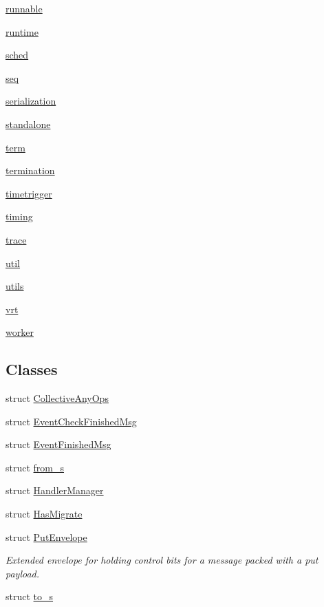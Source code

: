 \begin{DoxyCompactItemize}
 \hyperlink{namespacevt_1_1runnable}{runnable}
\item 
 \hyperlink{namespacevt_1_1runtime}{runtime}
\item 
 \hyperlink{namespacevt_1_1sched}{sched}
\item 
 \hyperlink{namespacevt_1_1seq}{seq}
\item 
 \hyperlink{namespacevt_1_1serialization}{serialization}
\item 
 \hyperlink{namespacevt_1_1standalone}{standalone}
\item 
 \hyperlink{namespacevt_1_1term}{term}
\item 
 \hyperlink{namespacevt_1_1termination}{termination}
\item 
 \hyperlink{namespacevt_1_1timetrigger}{timetrigger}
\item 
 \hyperlink{namespacevt_1_1timing}{timing}
\item 
 \hyperlink{namespacevt_1_1trace}{trace}
\item 
 \hyperlink{namespacevt_1_1util}{util}
\item 
 \hyperlink{namespacevt_1_1utils}{utils}
\item 
 \hyperlink{namespacevt_1_1vrt}{vrt}
\item 
 \hyperlink{namespacevt_1_1worker}{worker}
\end{DoxyCompactItemize}
\subsection*{Classes}
\begin{DoxyCompactItemize}
\item 
struct \hyperlink{structvt_1_1_collective_any_ops}{Collective\+Any\+Ops}
\item 
struct \hyperlink{structvt_1_1_event_check_finished_msg}{Event\+Check\+Finished\+Msg}
\item 
struct \hyperlink{structvt_1_1_event_finished_msg}{Event\+Finished\+Msg}
\item 
struct \hyperlink{structvt_1_1from__s}{from\+\_\+s}
\item 
struct \hyperlink{structvt_1_1_handler_manager}{Handler\+Manager}
\item 
struct \hyperlink{structvt_1_1_has_migrate}{Has\+Migrate}
\item 
struct \hyperlink{structvt_1_1_put_envelope}{Put\+Envelope}
\begin{DoxyCompactList}\small\item\em Extended envelope for holding control bits for a message packed with a put payload. \end{DoxyCompactList}\item 
struct \hyperlink{structvt_1_1to__s}{to\+\_\+s}
\end{DoxyCompactItemize}
